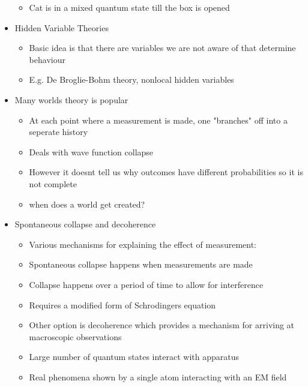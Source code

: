 \documentclass[12pt]{article}
\begin{document}
\begin{itemize}
\begin{itemize}
        \item Cat is in a mixed quantum state till the box is opened
    \end{itemize}
    \item Hidden Variable Theories \begin{itemize}
        \item Basic idea is that there are variables we are not aware of that determine behaviour 
        \item E.g. De Broglie-Bohm theory, nonlocal hidden variables 
    \end{itemize}
    \item Many worlds theory is popular \begin{itemize}
        \item At each point where a measurement is made, one "branches" off into a seperate history 
        \item Deals with wave function collapse 
        \item However it doesnt tell us why outcomes have different probabilities so it is not complete 
        \item when does a world get created?
    \end{itemize}
    \item Spontaneous collapse and decoherence \begin{itemize}
        \item Various mechanisms for explaining the effect of measurement: 
        \item Spontaneous collapse happens when measurements are made 
        \item Collapse happens over a period of time to allow for interference 
        \item Requires a modified form of Schrodingers equation 
        \item Other option is decoherence which provides a mechanism for arriving at macroscopic observations 
        \item Large number of quantum states interact with apparatus 
        \item Real phenomena shown by a single atom interacting with an EM field
    \end{itemize}
\end{itemize}
\end{document}
